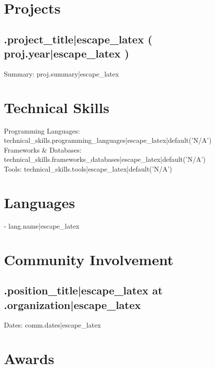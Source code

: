 \documentclass[a4paper]{article}
\begin{document}
{{{{{{{{{{{{{{{{{\section*{Projects}
{%
{%
\subsection*{{\proj.project_title|escape_latex} ({{ proj.year|escape_latex }})}
Summary: {{ proj.summary|escape_latex }}
{%
{%

\section*{Technical Skills}
{%
Programming Languages: {{ technical_skills.programming_languages|escape_latex|default('N/A') }} \\
Frameworks & Databases: {{ technical_skills.frameworks_databases|escape_latex|default('N/A') }} \\
Tools: {{ technical_skills.tools|escape_latex|default('N/A') }}
{%

\section*{Languages}
{%
{%
- {{ lang.name|escape_latex }} \\
{%
{%

\section*{Community Involvement}
{%
{%
\subsection*{{\comm.position_title|escape_latex} at {\comm.organization|escape_latex}}
Dates: {{ comm.dates|escape_latex }} \\
{%
{%
{%

\section*{Awards}
{%
{%
}}}}}}}}}}}}}}}}}}}}}}}}}}}}}}}}}}
\end{document}
